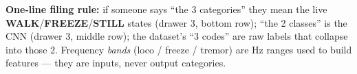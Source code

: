 \documentclass[11pt]{article}
\newcommand{\chip}[2]{{\color{#1}\textbf{#2}}}
\begin{document}
\vspace{5pt}
{\footnotesize\color{muted}\textbf{One-line filing rule:} if someone says ``the 3 categories''
they mean the live \chip{teal}{WALK}/\chip{amber}{FREEZE}/\chip{good}{STILL} states (drawer 3, bottom row);
``the 2 classes'' is the CNN (drawer 3, middle row); the dataset's ``3 codes'' are raw labels that
collapse into those 2. Frequency \emph{bands} (loco / freeze / tremor) are Hz ranges used to build
features — they are inputs, never output categories.}
\end{document}
